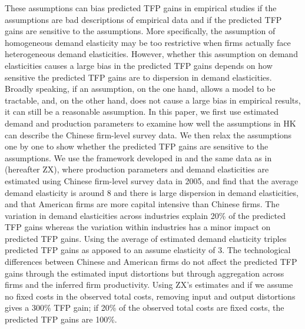 \documentclass[12pt]{article}
\begin{document}
These assumptions can bias predicted TFP gains in empirical studies if the assumptions are bad descriptions of empirical data and if the predicted TFP gains are sensitive to the assumptions. More specifically, the assumption of homogeneous demand elasticity may be too restrictive when firms actually face heterogeneous demand elasticities. However, whether this assumption on demand elasticities causes a large bias in the predicted TFP gains depends on how sensitive the predicted TFP gains are to dispersion in demand elasticities. Broadly speaking, if an assumption, on the one hand, allows a model to be tractable, and, on the other hand, does not cause a large bias in empirical results, it can still be a reasonable assumption. In this paper, we first use estimated demand and production parameters to examine how well the assumptions in HK can describe the Chinese firm-level survey data. We then relax the assumptions one by one to show whether the predicted TFP gains are sensitive to the assumptions. We use the framework developed in and the same data as in \citet{zhangFactorShares} (hereafter ZX), where production parameters and demand elasticities are estimated using Chinese firm-level survey data in 2005, and find that the average demand elasticity is around 8 and there is large dispersion in demand elasticities, and that American firms are more capital intensive than Chinese firms. The variation in demand elasticities across industries explain 20\% of the predicted TFP gains whereas the variation within industries has a minor impact on predicted TFP gains. Using the average of estimated demand elasticity triples predicted TFP gains as apposed to an assume elasticity of 3. The technological differences between Chinese and American firms do not affect the predicted TFP gains through the estimated input distortions but through aggregation across firms and the inferred firm productivity. Using ZX's estimates and if we assume no fixed costs in the observed total costs, removing input and output distortions gives a $300\%$ TFP gain; if 20\% of the observed total costs are fixed costs, the predicted TFP gains are 100\%. 
\end{document}
